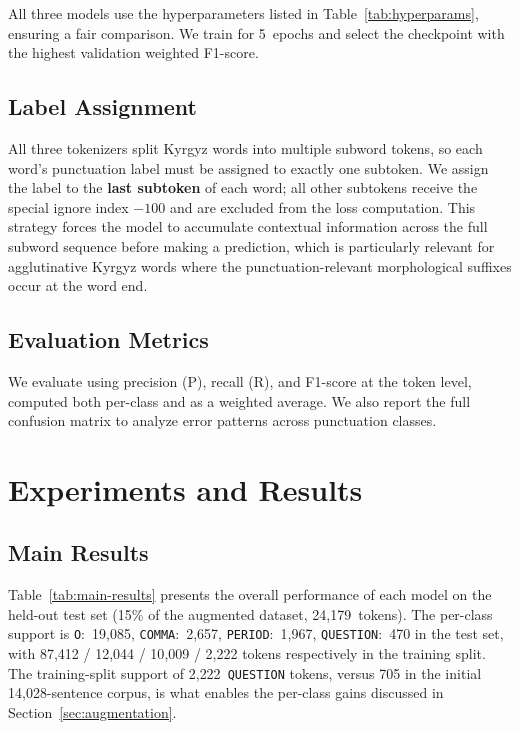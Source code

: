 \documentclass[manuscript, review]{acmart}
\begin{document}
All three models use the hyperparameters listed in Table~\ref{tab:hyperparams}, ensuring a fair comparison. We train for 5~epochs and select the checkpoint with the highest validation weighted F1-score.

\subsection{Label Assignment}

All three tokenizers split Kyrgyz words into multiple subword tokens, so each word's punctuation label must be assigned to exactly one subtoken. We assign the label to the \textbf{last subtoken} of each word; all other subtokens receive the special ignore index $-100$ and are excluded from the loss computation. This strategy forces the model to accumulate contextual information across the full subword sequence before making a prediction, which is particularly relevant for agglutinative Kyrgyz words where the punctuation-relevant morphological suffixes occur at the word end.

\subsection{Evaluation Metrics}

We evaluate using precision (P), recall (R), and F1-score at the token level, computed both per-class and as a weighted average. We also report the full confusion matrix to analyze error patterns across punctuation classes.

\section{Experiments and Results}
\label{sec:results}

\subsection{Main Results}
\label{sec:main-results}

Table~\ref{tab:main-results} presents the overall performance of each model on the held-out test set (15\% of the augmented dataset, 24{,}179~tokens). The per-class support is \texttt{O}:~19{,}085, \texttt{COMMA}:~2{,}657, \texttt{PERIOD}:~1{,}967, \texttt{QUESTION}:~470 in the test set, with 87{,}412 / 12{,}044 / 10{,}009 / 2{,}222 tokens respectively in the training split. The training-split support of 2{,}222~\texttt{QUESTION} tokens, versus 705 in the initial 14{,}028-sentence corpus, is what enables the per-class gains discussed in Section~\ref{sec:augmentation}.
\end{document}
